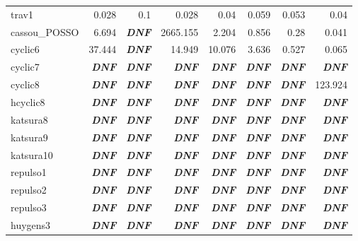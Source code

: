 \documentclass[letterpaper,12pt,titlepage,oneside,final]{book}
\begin{document}
\begin{center}
\begin{tabular}{| l || r | r | r || r | r || r | r ||}
  trav1 & 0.028 & 0.1 & 0.028 & 0.04 & 0.059 & 0.053 & 0.04\\
  cassou\_POSSO & 6.694 & \textbf{\textit{DNF}} & 2665.155 & 2.204 & 0.856 & 0.28 & 0.041\\
  cyclic6 & 37.444 & \textbf{\textit{DNF}} & 14.949 & 10.076 & 3.636 & 0.527 & 0.065\\
  cyclic7 & \textbf{\textit{DNF}} & \textbf{\textit{DNF}} & \textbf{\textit{DNF}} & \textbf{\textit{DNF}} & \textbf{\textit{DNF}} & \textbf{\textit{DNF}} & \textbf{\textit{DNF}}\\
  cyclic8 & \textbf{\textit{DNF}} & \textbf{\textit{DNF}} & \textbf{\textit{DNF}} & \textbf{\textit{DNF}} & \textbf{\textit{DNF}} & \textbf{\textit{DNF}} & 123.924\\
  hcyclic8 & \textbf{\textit{DNF}} & \textbf{\textit{DNF}} & \textbf{\textit{DNF}} & \textbf{\textit{DNF}} & \textbf{\textit{DNF}} & \textbf{\textit{DNF}} & \textbf{\textit{DNF}}\\
  katsura8 & \textbf{\textit{DNF}} & \textbf{\textit{DNF}} & \textbf{\textit{DNF}} & \textbf{\textit{DNF}} & \textbf{\textit{DNF}} & \textbf{\textit{DNF}} & \textbf{\textit{DNF}}\\
  katsura9 & \textbf{\textit{DNF}} & \textbf{\textit{DNF}} & \textbf{\textit{DNF}} & \textbf{\textit{DNF}} & \textbf{\textit{DNF}} & \textbf{\textit{DNF}} & \textbf{\textit{DNF}}\\
  katsura10 & \textbf{\textit{DNF}} & \textbf{\textit{DNF}} & \textbf{\textit{DNF}} & \textbf{\textit{DNF}} & \textbf{\textit{DNF}} & \textbf{\textit{DNF}} & \textbf{\textit{DNF}}\\
  repulso1 & \textbf{\textit{DNF}} & \textbf{\textit{DNF}} & \textbf{\textit{DNF}} & \textbf{\textit{DNF}} & \textbf{\textit{DNF}} & \textbf{\textit{DNF}} & \textbf{\textit{DNF}}\\
  repulso2 & \textbf{\textit{DNF}} & \textbf{\textit{DNF}} & \textbf{\textit{DNF}} & \textbf{\textit{DNF}} & \textbf{\textit{DNF}} & \textbf{\textit{DNF}} & \textbf{\textit{DNF}}\\
  repulso3 & \textbf{\textit{DNF}} & \textbf{\textit{DNF}} & \textbf{\textit{DNF}} & \textbf{\textit{DNF}} & \textbf{\textit{DNF}} & \textbf{\textit{DNF}} & \textbf{\textit{DNF}}\\
  huygens3 & \textbf{\textit{DNF}} & \textbf{\textit{DNF}} & \textbf{\textit{DNF}} & \textbf{\textit{DNF}} & \textbf{\textit{DNF}} & \textbf{\textit{DNF}} & \textbf{\textit{DNF}}
  \\ %
  \hline
  \end{tabular}
\end{center}
\doublespacing
\end{document}
